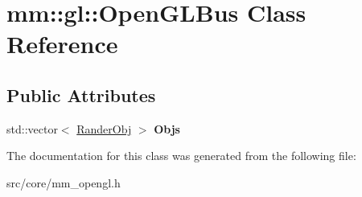 \hypertarget{classmm_1_1gl_1_1_open_g_l_bus}{}\section{mm\+:\+:gl\+:\+:Open\+G\+L\+Bus Class Reference}
\label{classmm_1_1gl_1_1_open_g_l_bus}
\subsection*{Public Attributes}
\begin{DoxyCompactItemize}
\item 
\hypertarget{classmm_1_1gl_1_1_open_g_l_bus_afaf54a9dd350868c77c256ba457923a6}{}std\+::vector$<$ \hyperlink{classmm_1_1gl_1_1_rander_obj}{Rander\+Obj} $>$ {\bfseries Objs}\label{classmm_1_1gl_1_1_open_g_l_bus_afaf54a9dd350868c77c256ba457923a6}

\end{DoxyCompactItemize}


The documentation for this class was generated from the following file\+:\begin{DoxyCompactItemize}
\item 
src/core/mm\+\_\+opengl.\+h\end{DoxyCompactItemize}
